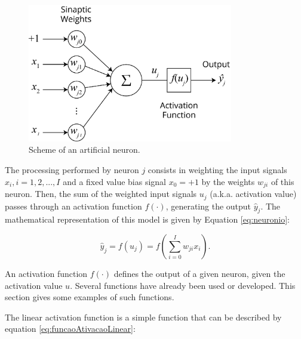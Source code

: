 \begin{figure}[h!]
	\begin{center}
		\includegraphics[width=0.8\textwidth]{"Part 3 - Learning Systems/Supervised Learning/Multilayer Perceptron/figures/neuronioArtificial_v2@4x.png"}
	\end{center}
	\caption{Scheme of an artificial neuron.}
	\label{fig:neuronio}
\end{figure}

The processing performed by neuron $j$ consists in weighting the input signals $x_i , i=1, 2,..., I$ and a fixed value bias signal $x_0=+1$ by the weights $w_{ji}$ of this neuron. Then, the sum of the weighted input signals $u_j$ (a.k.a. activation value) passes through an activation function $f(\cdot)$, generating the output $\hat{y}_j$. The mathematical representation of this model is given by Equation \ref{eq:neuronio}:


\begin{equation}
    \label{eq:neuronio}
    \hat{y}_j = f(u_j) = f \left( \sum_{i=0}^I w_{ji} x_i  \right).
\end{equation}

\label{ssec:ativacao}

An activation function $f(\cdot)$ defines the output of a given neuron, given the activation value $u$. Several functions have already been used or developed. This section gives some examples of such functions.

The linear activation function is a simple function that can be described by equation \ref{eq:funcaoAtivacaoLinear}: 


